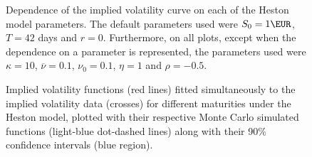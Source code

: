 \begin{figure}[H]
  \begin{subfigmatrix}{2}
  \end{subfigmatrix}
  \caption[Dependence of the implied volatility curve on each of the Heston model parameters.]{Dependence of the implied volatility curve on each of the Heston model parameters. The default parameters used were $S_0=1\EUR$, $T=42$ days and $r=0$. Furthermore, on all plots, except when the dependence on a parameter is represented, the parameters used were $\kappa=10$, $\overline{\nu}=0.1$, $\nu_0=0.1$, $\eta=1$ and $\rho=-0.5$.}
  \label{fig:Hparam}
\end{figure}


\begin{figure}[H]
  \begin{subfigmatrix}{2}
  \end{subfigmatrix}
  \caption[Implied volatility functions fitted simultaneously to the implied volatility data for different maturities under the Heston model, plotted with their respective Monte Carlo simulated functions along with their 90\% confidence intervals.]{Implied volatility functions (red lines) fitted simultaneously to the implied volatility data (crosses) for different maturities under the Heston model, plotted with their respective Monte Carlo simulated functions (light-blue dot-dashed lines) along with their 90\% confidence intervals (blue region).}
  \label{fig:H}
\end{figure}




